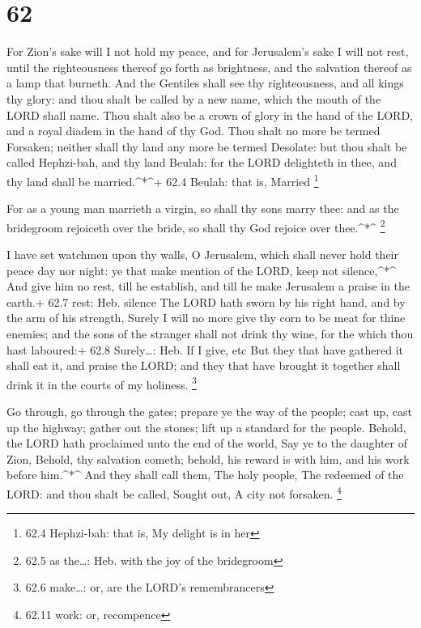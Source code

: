 \hypertarget{section-61}{%
\section{62}\label{section-61}}

 For Zion's sake will I not hold my peace, and for
Jerusalem's sake I will not rest, until the righteousness thereof go
forth as brightness, and the salvation thereof as a lamp that burneth.
 And the Gentiles shall see thy righteousness, and all kings
thy glory: and thou shalt be called by a new name, which the mouth of
the LORD shall name.  Thou shalt also be a crown of glory in
the hand of the LORD, and a royal diadem in the hand of thy God.
 Thou shalt no more be termed Forsaken; neither shall thy
land any more be termed Desolate: but thou shalt be called Hephzi-bah,
and thy land Beulah: for the LORD delighteth in thee, and thy land shall
be married.\^{}*\^{}+ 62.4 Beulah: that is, Married \footnote{62.4
  Hephzi-bah: that is, My delight is in her}

 For as a young man marrieth a virgin, so shall thy sons
marry thee: and as the bridegroom rejoiceth over the bride, so shall thy
God rejoice over thee.\^{}*\^{} \footnote{62.5 as the\ldots: Heb. with
  the joy of the bridegroom}

 I have set watchmen upon thy walls, O Jerusalem, which
shall never hold their peace day nor night: ye that make mention of the
LORD, keep not silence,\^{}*\^{}  And give him no rest, till
he establish, and till he make Jerusalem a praise in the earth.+ 62.7
rest: Heb. silence  The LORD hath sworn by his right hand,
and by the arm of his strength, Surely I will no more give thy corn to
be meat for thine enemies; and the sons of the stranger shall not drink
thy wine, for the which thou hast laboured:+ 62.8 Surely\ldots: Heb. If
I give, etc  But they that have gathered it shall eat it,
and praise the LORD; and they that have brought it together shall drink
it in the courts of my holiness. \footnote{62.6 make\ldots: or, are the
  LORD's remembrancers}

 Go through, go through the gates; prepare ye the way of
the people; cast up, cast up the highway; gather out the stones; lift up
a standard for the people.  Behold, the LORD hath
proclaimed unto the end of the world, Say ye to the daughter of Zion,
Behold, thy salvation cometh; behold, his reward is with him, and his
work before him.\^{}*\^{}  And they shall call them, The
holy people, The redeemed of the LORD: and thou shalt be called, Sought
out, A city not forsaken. \footnote{62.11 work: or, recompence}

